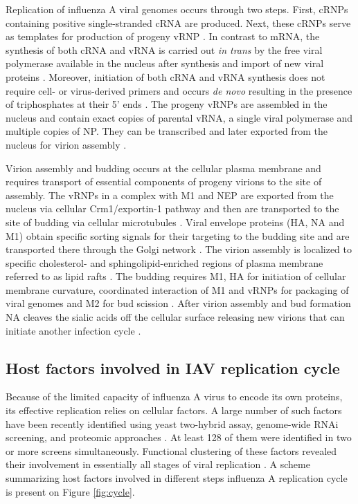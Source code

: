 	Replication of influenza A viral genomes occurs through two steps. First, \gls{cRNP}s containing positive single-stranded cRNA are produced. Next, these \gls{cRNP}s serve as templates for production of progeny \gls{vRNP} \parencite{Elton2005}. In contrast to mRNA, the synthesis of both cRNA and vRNA is carried out \textit{in trans} by the free viral polymerase available in the nucleus after synthesis and import of new viral proteins \parencite{Jorba2009, Moeller2012}. Moreover, initiation of both cRNA and vRNA synthesis does not require cell- or virus-derived primers and occurs \textit{de novo} resulting in the presence of triphosphates at their 5' ends \parencite{Hay1982, Zhang2010}. The progeny \gls{vRNP}s are assembled in the nucleus and contain exact copies of parental vRNA, a single viral polymerase and multiple copies of \gls{NP}. They can be transcribed and later exported from the nucleus for virion assembly \parencite{Resa-Infante2011}. 
	
	Virion assembly and budding occurs at the cellular plasma membrane and requires transport of essential components of progeny virions to the site of assembly. The \gls{vRNP}s in a complex with \gls{M1} and \gls{NEP} are exported from the nucleus via cellular Crm1/exportin-1 pathway and then are transported to the site of budding via cellular microtubules \parencite{Akarsu2003, Momose2007, Kawaguchi2012}. Viral envelope proteins (\gls{HA}, \gls{NA} and \gls{M1}) obtain specific sorting signals for their targeting to the budding site \parencite{Hughey1992, Kundu1996, Tall2003} and are transported there through the Golgi network \parencite{Daniels-Holgate1989}. The virion assembly is localized to specific  cholesterol- and sphingolipid-enriched regions of plasma membrane referred to as lipid rafts \parencite{Scheiffele1999}. The budding requires \gls{M1}, \gls{HA} for initiation of cellular membrane curvature, coordinated interaction of \gls{M1} and \gls{vRNP}s for packaging of viral genomes and \gls{M2} for bud scission \parencite{Nayak2009a, Rossman2011}. After virion assembly and bud formation \gls{NA} cleaves the sialic acids off the cellular surface releasing new virions that can initiate another infection cycle \parencite{Barman2004}.

	
	\subsection{Host factors involved in IAV replication cycle}
	
	Because of the limited capacity of influenza A virus to encode its own proteins, its effective replication relies on cellular factors. A large number of such factors have been recently identified using yeast two-hybrid assay, genome-wide RNAi screening, and proteomic approaches \parencite{Mayer2007, Brass2009, Shapira2009, Hao2008, Karlas2010, Konig2010, Shaw2011, Song2011}. At least 128 of them were identified in two or more screens simultaneously. Functional clustering of these factors revealed their involvement in essentially all stages of viral replication \parencite{Watanabe2010}. A scheme summarizing host factors involved in different steps influenza A replication cycle is present on Figure \ref{fig:cycle}.
	

